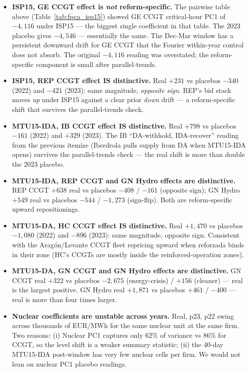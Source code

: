 \documentclass[11pt,a4paper]{article}
\begin{document}
\begin{itemize}
\item \textbf{ISP15, GE CCGT effect is \emph{not} reform-specific.} The pairwise table above (Table~\ref{tab:fpca_isp15}) showed GE CCGT critical-hour PC1 of $-4{,}116$ under ISP15 --- the biggest single coefficient in that table. The 2023 placebo gives $-4{,}546$ --- essentially the same. The Dec-Mar window has a persistent downward drift for GE CCGT that the Fourier within-year control does not absorb. The original $-4{,}116$ reading was overstated; the reform-specific component is small after parallel-trends.
\item \textbf{ISP15, REP CCGT effect IS distinctive.} Real $+231$ vs placebos $-340$ (2022) and $-421$ (2023): same magnitude, \emph{opposite sign}. REP's bid stack moves \emph{up} under ISP15 against a clear prior \emph{down} drift --- a reform-specific shift that survives the parallel-trends check.
\item \textbf{MTU15-IDA, IB CCGT effect IS distinctive.} Real $+798$ vs placebos $-161$ (2022) and $+329$ (2023). The IB ``DA-withhold, IDA-recover'' reading from the previous itemize (Iberdrola pulls supply from DA when MTU15-IDA opens) survives the parallel-trends check --- the real shift is more than double the 2023 placebo.
\item \textbf{MTU15-IDA, REP CCGT and GN Hydro effects are distinctive.} REP CCGT $+638$ real vs placebos $-408$ / $-161$ (opposite sign); GN Hydro $+549$ real vs placebos $-544$ / $-1{,}273$ (sign-flip). Both are reform-specific upward repositionings.
\item \textbf{MTU15-DA, HC CCGT effect IS distinctive.} Real $+1{,}470$ vs placebos $-1{,}080$ (2022) and $-896$ (2023): same magnitude, opposite sign. Consistent with the Aragón/Levante CCGT fleet repricing upward when reforzada binds in their zone (HC's CCGTs are mostly inside the reinforced-operation zones).
\item \textbf{MTU15-DA, GN CCGT and GN Hydro effects are distinctive.} GN CCGT real $+322$ vs placebos $-2{,}675$ (energy-crisis) / $+156$ (cleaner) --- real is the largest positive. GN Hydro real $+1{,}871$ vs placebos $+461$ / $-400$ --- real is more than four times larger.
\item \textbf{Nuclear coefficients are unstable across years.} Real, p23, p22 swing across thousands of EUR/MWh for the same nuclear unit at the same firm. Two reasons: (i) Nuclear PC1 captures only $62\%$ of variance vs $86\%$ for CCGT, so the level shift is a weaker summary statistic; (ii) the 40-day MTU15-IDA post-window has very few nuclear cells per firm. We would not lean on nuclear PC1 placebo readings.
\end{itemize}
\end{document}
